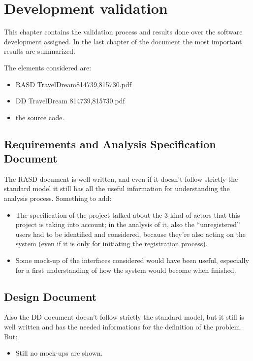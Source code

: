 \documentclass[a4paper,12pt]{book}
\begin{document}
\chapter{Development validation}
This chapter contains the validation process and results done over the software development assigned. In the last chapter of the document the most important results are summarized.

The elements considered are:
\begin{itemize}
  \item RASD TravelDream814739,815730.pdf
  \item DD TravelDream 814739,815730.pdf
  \item the source code.
\end{itemize}

\section{Requirements and Analysis Specification Document}
The RASD document is well written, and even if it doesn't follow strictly the standard model it still has all the useful information for understanding the analysis process. Something to add:
\begin{itemize}
  \item The specification of the project talked about the 3 kind of actors that this project is taking into account; in the analysis of it, also the ``unregistered'' users had to be identified and considered, because they're also acting on the system (even if it is only for initiating the registration process).
  \item Some mock-up of the interfaces considered would have been useful, especially for a first understanding of how the system would become when finished. 
\end{itemize}

\section{Design Document}
Also the DD document doesn't follow strictly the standard model, but it still is well written and has the needed informations for the definition of the problem. But:
\begin{itemize}
  \item Still no mock-ups are shown.
\end{itemize}
\end{document}
